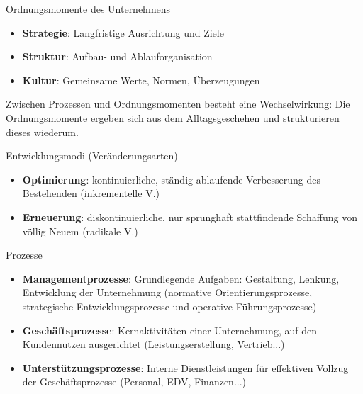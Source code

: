 \begin{minipage}{0.55\linewidth}
\begin{corollary}{Ordnungsmomente} des Unternehmens
\begin{itemize}
    \item \textbf{Strategie}: Langfristige Ausrichtung und Ziele 
    \item \textbf{Struktur}: Aufbau- und Ablauforganisation 
    \item \textbf{Kultur}: Gemeinsame Werte, Normen, Überzeugungen
\end{itemize}
\small
Zwischen Prozessen und Ordnungsmomenten besteht eine Wechselwirkung: Die Ordnungsmomente ergeben sich aus dem Alltagsgeschehen und strukturieren dieses wiederum.
\end{corollary}

\begin{corollary}{Entwicklungsmodi} (Veränderungsarten) 
\begin{itemize}
    \item \textbf{Optimierung}: kontinuierliche, ständig ablaufende Verbesserung des Bestehenden (inkrementelle V.)
    \item \textbf{Erneuerung}: diskontinuierliche, nur sprunghaft stattfindende Schaffung von völlig Neuem (radikale V.)
\end{itemize}
\end{corollary}
\end{minipage}
\begin{minipage}{0.45\linewidth}

\begin{corollary}{Prozesse}
\begin{itemize}
    \item \textbf{Managementprozesse}: Grundlegende Aufgaben: Gestaltung, Lenkung, Entwicklung der Unternehmung (normative Orientierungsprozesse, strategische Entwicklungsprozesse und operative Führungsprozesse)
    \item \textbf{Geschäftsprozesse}: Kernaktivitäten einer Unternehmung, auf den Kundennutzen ausgerichtet (Leistungserstellung, Vertrieb...)
    \item \textbf{Unterstützungsprozesse}: Interne Dienstleistungen für effektiven Vollzug der Geschäftsprozesse (Personal, EDV, Finanzen...)
\end{itemize}
\end{corollary}
\end{minipage}